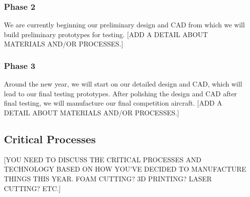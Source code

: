\subsubsection{Phase 2} We are currently beginning our preliminary design and CAD from which we will build preliminary prototypes for testing. {\color{BYUred}[ADD A DETAIL ABOUT MATERIALS AND/OR PROCESSES.]}

\subsubsection{Phase 3} Around the new year, we will start on our detailed design and CAD, which will lead to our final testing prototypes.  After polishing the design and CAD after final testing, we will manufacture our final competition aircraft. {\color{BYUred}[ADD A DETAIL ABOUT MATERIALS AND/OR PROCESSES.]}



\subsection{Critical Processes}
\label{ssec:CriticalProcesses}

{\color{BYUred}[YOU NEED TO DISCUSS THE CRITICAL PROCESSES AND TECHNOLOGY BASED ON HOW YOU'VE DECIDED TO MANUFACTURE THINGS THIS YEAR.  FOAM CUTTING? 3D PRINTING? LASER CUTTING? ETC.]}
\lipsum[3]

